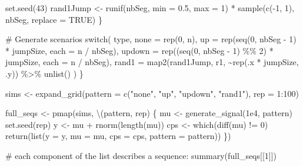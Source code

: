 \documentclass[
  letterpaper,
  DIV=11,
  numbers=noendperiod]{scrreprt}
\newenvironment{Shaded}{\begin{snugshade}}{\end{snugshade}}
\newcommand{\AttributeTok}[1]{\textcolor[rgb]{0.40,0.45,0.13}{#1}}
\newcommand{\CommentTok}[1]{\textcolor[rgb]{0.37,0.37,0.37}{#1}}
\newcommand{\ConstantTok}[1]{\textcolor[rgb]{0.56,0.35,0.01}{#1}}
\newcommand{\ControlFlowTok}[1]{\textcolor[rgb]{0.00,0.23,0.31}{#1}}
\newcommand{\DecValTok}[1]{\textcolor[rgb]{0.68,0.00,0.00}{#1}}
\newcommand{\FloatTok}[1]{\textcolor[rgb]{0.68,0.00,0.00}{#1}}
\newcommand{\FunctionTok}[1]{\textcolor[rgb]{0.28,0.35,0.67}{#1}}
\newcommand{\NormalTok}[1]{\textcolor[rgb]{0.00,0.23,0.31}{#1}}
\newcommand{\OtherTok}[1]{\textcolor[rgb]{0.00,0.23,0.31}{#1}}
\newcommand{\SpecialCharTok}[1]{\textcolor[rgb]{0.37,0.37,0.37}{#1}}
\newcommand{\StringTok}[1]{\textcolor[rgb]{0.13,0.47,0.30}{#1}}
\begin{document}
\begin{Shaded}
\begin{Highlighting}[]
    \FunctionTok{set.seed}\NormalTok{(}\DecValTok{43}\NormalTok{)}
\NormalTok{    rand1Jump }\OtherTok{\textless{}{-}} \FunctionTok{runif}\NormalTok{(nbSeg, }\AttributeTok{min =} \FloatTok{0.5}\NormalTok{, }\AttributeTok{max =} \DecValTok{1}\NormalTok{) }\SpecialCharTok{*} \FunctionTok{sample}\NormalTok{(}\FunctionTok{c}\NormalTok{(}\SpecialCharTok{{-}}\DecValTok{1}\NormalTok{, }\DecValTok{1}\NormalTok{), nbSeg, }\AttributeTok{replace =} \ConstantTok{TRUE}\NormalTok{)}
\NormalTok{  \}}

  \CommentTok{\# Generate scenarios}
  \ControlFlowTok{switch}\NormalTok{(}
\NormalTok{    type,}
    \AttributeTok{none =} \FunctionTok{rep}\NormalTok{(}\DecValTok{0}\NormalTok{, n),}
    \AttributeTok{up =} \FunctionTok{rep}\NormalTok{(}\FunctionTok{seq}\NormalTok{(}\DecValTok{0}\NormalTok{, nbSeg }\SpecialCharTok{{-}} \DecValTok{1}\NormalTok{) }\SpecialCharTok{*}\NormalTok{ jumpSize, }\AttributeTok{each =}\NormalTok{ n }\SpecialCharTok{/}\NormalTok{ nbSeg),}
    \AttributeTok{updown =} \FunctionTok{rep}\NormalTok{((}\FunctionTok{seq}\NormalTok{(}\DecValTok{0}\NormalTok{, nbSeg }\SpecialCharTok{{-}} \DecValTok{1}\NormalTok{) }\SpecialCharTok{\%\%} \DecValTok{2}\NormalTok{) }\SpecialCharTok{*}\NormalTok{ jumpSize, }\AttributeTok{each =}\NormalTok{ n }\SpecialCharTok{/}\NormalTok{ nbSeg),}
    \AttributeTok{rand1 =} \FunctionTok{map2}\NormalTok{(rand1Jump, r1, }\SpecialCharTok{\textasciitilde{}}\FunctionTok{rep}\NormalTok{(.x }\SpecialCharTok{*}\NormalTok{ jumpSize, .y)) }\SpecialCharTok{\%\textgreater{}\%} \FunctionTok{unlist}\NormalTok{()}
\NormalTok{  )}
\NormalTok{\}}

\NormalTok{sims }\OtherTok{\textless{}{-}} \FunctionTok{expand\_grid}\NormalTok{(}\AttributeTok{pattern =} \FunctionTok{c}\NormalTok{(}\StringTok{"none"}\NormalTok{, }\StringTok{"up"}\NormalTok{, }\StringTok{"updown"}\NormalTok{, }\StringTok{"rand1"}\NormalTok{), }\AttributeTok{rep =} \DecValTok{1}\SpecialCharTok{:}\DecValTok{100}\NormalTok{)}

\NormalTok{full\_seqs }\OtherTok{\textless{}{-}} \FunctionTok{pmap}\NormalTok{(sims, \textbackslash{}(pattern, rep) \{}
\NormalTok{  mu }\OtherTok{\textless{}{-}} \FunctionTok{generate\_signal}\NormalTok{(}\FloatTok{1e4}\NormalTok{, pattern)}
  \FunctionTok{set.seed}\NormalTok{(rep)}
\NormalTok{  y }\OtherTok{\textless{}{-}}\NormalTok{ mu }\SpecialCharTok{+} \FunctionTok{rnorm}\NormalTok{(}\FunctionTok{length}\NormalTok{(mu))}
\NormalTok{  cps }\OtherTok{\textless{}{-}} \FunctionTok{which}\NormalTok{(}\FunctionTok{diff}\NormalTok{(mu) }\SpecialCharTok{!=} \DecValTok{0}\NormalTok{)}
\FunctionTok{return}\NormalTok{(}\FunctionTok{list}\NormalTok{(}\AttributeTok{y =}\NormalTok{ y, }\AttributeTok{mu =}\NormalTok{ mu, }\AttributeTok{cps =}\NormalTok{ cps, }\AttributeTok{pattern =}\NormalTok{ pattern))}
\NormalTok{\})}

\CommentTok{\# each component of the list describes a sequence:}
\FunctionTok{summary}\NormalTok{(full\_seqs[[}\DecValTok{1}\NormalTok{]])}
\end{Highlighting}
\end{Shaded}
\end{document}
